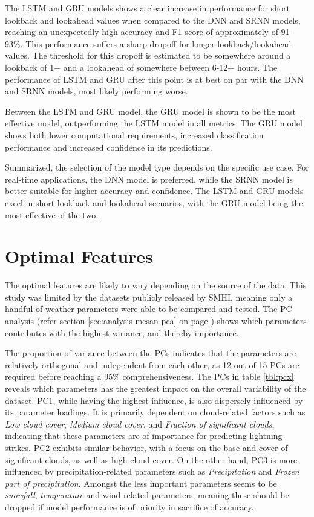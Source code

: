 The LSTM and GRU models shows a clear increase in performance for short lookback and lookahead values when compared to the DNN and SRNN models, reaching an unexpectedly high accuracy and F1 score of approximately of 91-93\%. This performance suffers a sharp dropoff for longer lookback/lookahead values. The threshold for this dropoff is estimated to be somewhere around a lookback of 1+ and a lookahead of somewhere between 6-12+ hours. The performance of LSTM and GRU after this point is at best on par with the DNN and SRNN models, most likely performing worse.

Between the LSTM and GRU model, the GRU model is shown to be the most effective model, outperforming the LSTM model in all metrics. The GRU model shows both lower computational requirements, increased classification performance and increased confidence in its predictions.

Summarized, the selection of the model type depends on the specific use case. For real-time applications, the DNN model is preferred, while the SRNN model is better suitable for higher accuracy and confidence. The LSTM and GRU models excel in short lookback and lookahead scenarios, with the GRU model being the most effective of the two.

\section{Optimal Features}

The optimal features are likely to vary depending on the source of the data. This study was limited by the datasets publicly released by SMHI, meaning only a handful of weather parameters were able to be compared and tested. The PC analysis (refer section \ref{sec:analysis-mesan-pca} on page \pageref{sec:analysis-mesan-pca}) shows which parameters contributes with the highest variance, and thereby importance.

The proportion of variance between the PCs indicates that the parameters are relatively orthogonal and independent from each other, as 12 out of 15 PCs are required before reaching a 95\% comprehensiveness. The PCs in table \ref{tbl:pcx} reveals which parameters has the greatest impact on the overall variability of the dataset. PC1, while having the highest influence, is also dispersely influenced by its parameter loadings. It is primarily dependent on cloud-related factors such as \textit{Low cloud cover}, \textit{Medium cloud cover}, and \textit{Fraction of significant clouds}, indicating that these parameters are of importance for predicting lightning strikes. PC2 exhibits similar behavior, with a focus on the base and cover of significant clouds, as well as high cloud cover. On the other hand, PC3 is more influenced by precipitation-related parameters such as \textit{Precipitation} and \textit{Frozen part of precipitation}. Amongst the less important parameters seems to be \textit{snowfall}, \textit{temperature} and wind-related parameters, meaning these should be dropped if model performance is of priority in sacrifice of accuracy.

